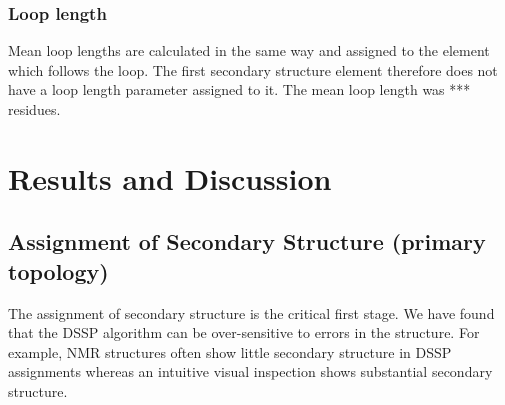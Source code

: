 \documentclass{article}
\begin{document}
\subsubsection{Loop length}
Mean loop lengths are calculated in the same way and assigned to the
element which follows the loop. The first secondary structure element
therefore does not have a loop length parameter assigned to it. The
mean loop length was *** residues.










\section{Results and Discussion}
%
%
%
%

\subsection{Assignment of Secondary Structure (primary topology)}
The assignment of secondary structure is the critical first stage. We
have found that the DSSP algorithm can be over-sensitive to errors in
the structure. For example, NMR structures often show little secondary
structure in DSSP assignments whereas an intuitive visual inspection
shows substantial secondary structure. 
\end{document}
